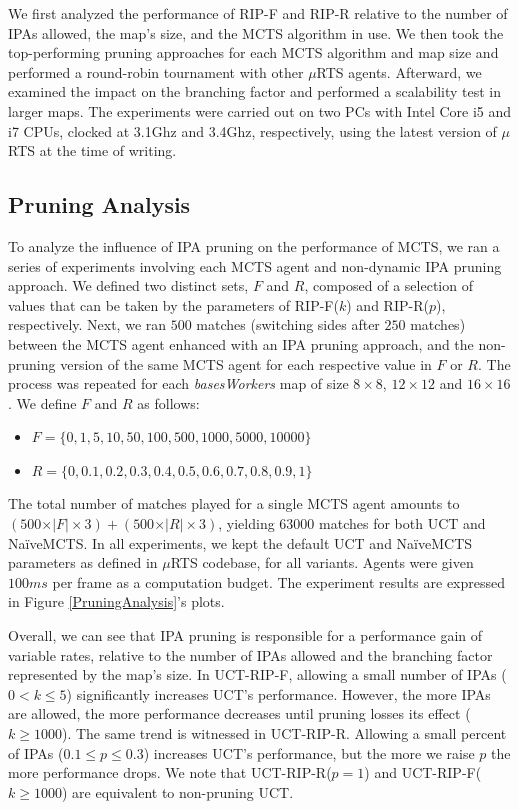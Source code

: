 \documentclass[conference]{IEEEtran}
\newcommand{\mRTS}{$\mu$RTS}
\begin{document}
We first analyzed the performance of RIP-F and RIP-R relative to the number of IPAs allowed, the map's size, and the MCTS algorithm in use. We then took the top-performing pruning approaches for each MCTS algorithm and map size and performed a round-robin tournament with other \mRTS{} agents. Afterward, we examined the impact on the branching factor and performed a scalability test in larger maps. The experiments were carried out on two PCs with Intel Core i5 and i7 CPUs, clocked at 3.1Ghz and 3.4Ghz, respectively, using the latest version of \mRTS{} at the time of writing.


\subsection{Pruning Analysis}

To analyze the influence of IPA pruning on the performance of MCTS, we ran a series of experiments involving each MCTS agent and non-dynamic IPA pruning approach. We defined two distinct sets, $F$ and $R$, composed of a selection of values that can be taken by the parameters of RIP-F($k$) and RIP-R($p$), respectively. Next, we ran $500$ matches (switching sides after $250$ matches) between the MCTS agent enhanced with an IPA pruning approach, and the non-pruning version of the same MCTS agent for each respective value in $F$ or $R$. The process was repeated for each \textit{basesWorkers} map of size $8\times8$, $12\times12$ and $16\times16$. We define $F$ and $R$ as follows:

\begin{itemize}
\item $F = \{0, 1, 5, 10, 50, 100, 500, 1000, 5000, 10000\}$
\item $R = \{0, 0.1, 0.2, 0.3, 0.4, 0.5, 0.6, 0.7, 0.8, 0.9, 1\}$
\end{itemize}

The total number of matches played for a single MCTS agent amounts to $(500\times\vert F\vert\times3) + (500\times\vert R\vert\times3)$, yielding $63000$ matches for both UCT and NaïveMCTS. In all experiments, we kept the default UCT and NaïveMCTS parameters as defined in \mRTS{} codebase, for all variants. Agents were given $100ms$ per frame as a computation budget. The experiment results are expressed in Figure \ref{PruningAnalysis}'s plots.

Overall, we can see that IPA pruning is responsible for a performance gain of variable rates, relative to the number of IPAs allowed and the branching factor represented by the map's size. In UCT-RIP-F, allowing a small number of IPAs ($0 < k \leq 5$) significantly increases UCT's performance. However, the more IPAs are allowed, the more performance decreases until pruning losses its effect ($k \geq 1000$). The same trend is witnessed in UCT-RIP-R. Allowing a small percent of IPAs ($0.1 \leq p \leq 0.3$) increases UCT's performance, but the more we raise $p$ the more performance drops. We note that UCT-RIP-R($p=1$) and UCT-RIP-F($k \geq 1000$) are equivalent to non-pruning UCT.
\end{document}
